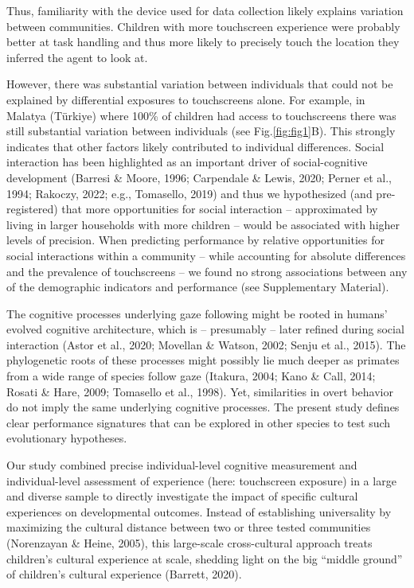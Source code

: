 \documentclass[
  man,floatsintext]{apa7}
\begin{document}
Thus, familiarity with the device used for data collection likely explains variation between communities. Children with more touchscreen experience were probably better at task handling and thus more likely to precisely touch the location they inferred the agent to look at.

However, there was substantial variation between individuals that could not be explained by differential exposures to touchscreens alone. For example, in Malatya (Türkiye) where 100\% of children had access to touchscreens there was still substantial variation between individuals (see Fig.\ref{fig:fig1}B). This strongly indicates that other factors likely contributed to individual differences. Social interaction has been highlighted as an important driver of social-cognitive development (Barresi \& Moore, 1996; Carpendale \& Lewis, 2020; Perner et al., 1994; Rakoczy, 2022; e.g., Tomasello, 2019) and thus we hypothesized (and pre-registered) that more opportunities for social interaction -- approximated by living in larger households with more children -- would be associated with higher levels of precision. When predicting performance by relative opportunities for social interactions within a community -- while accounting for absolute differences and the prevalence of touchscreens -- we found no strong associations between any of the demographic indicators and performance (see Supplementary Material).

The cognitive processes underlying gaze following might be rooted in humans' evolved cognitive architecture, which is -- presumably -- later refined during social interaction (Astor et al., 2020; Movellan \& Watson, 2002; Senju et al., 2015). The phylogenetic roots of these processes might possibly lie much deeper as primates from a wide range of species follow gaze (Itakura, 2004; Kano \& Call, 2014; Rosati \& Hare, 2009; Tomasello et al., 1998). Yet, similarities in overt behavior do not imply the same underlying cognitive processes. The present study defines clear performance signatures that can be explored in other species to test such evolutionary hypotheses.

Our study combined precise individual-level cognitive measurement and individual-level assessment of experience (here: touchscreen exposure) in a large and diverse sample to directly investigate the impact of specific cultural experiences on developmental outcomes. Instead of establishing universality by maximizing the cultural distance between two or three tested communities (Norenzayan \& Heine, 2005), this large-scale cross-cultural approach treats children's cultural experience at scale, shedding light on the big ``middle ground'' of children's cultural experience (Barrett, 2020).
\end{document}
